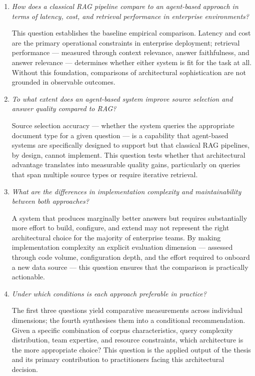 \begin{enumerate}

  \item \textit{How does a classical RAG pipeline compare to an agent-based approach in terms of latency, cost, and retrieval performance in enterprise environments?}

  This question establishes the baseline empirical comparison. Latency and cost are the primary operational constraints in enterprise deployment; retrieval performance — measured through context relevance, answer faithfulness, and answer relevance — determines whether either system is fit for the task at all. Without this foundation, comparisons of architectural sophistication are not grounded in observable outcomes.

  \item \textit{To what extent does an agent-based system improve source selection and answer quality compared to RAG?}

  Source selection accuracy — whether the system queries the appropriate document type for a given question — is a capability that agent-based systems are specifically designed to support but that classical RAG pipelines, by design, cannot implement. This question tests whether that architectural advantage translates into measurable quality gains, particularly on queries that span multiple source types or require iterative retrieval.

  \item \textit{What are the differences in implementation complexity and maintainability between both approaches?}

  A system that produces marginally better answers but requires substantially more effort to build, configure, and extend may not represent the right architectural choice for the majority of enterprise teams. By making implementation complexity an explicit evaluation dimension — assessed through code volume, configuration depth, and the effort required to onboard a new data source — this question ensures that the comparison is practically actionable.

  \item \textit{Under which conditions is each approach preferable in practice?}

  The first three questions yield comparative measurements across individual dimensions; the fourth synthesises them into a conditional recommendation. Given a specific combination of corpus characteristics, query complexity distribution, team expertise, and resource constraints, which architecture is the more appropriate choice? This question is the applied output of the thesis and its primary contribution to practitioners facing this architectural decision.

\end{enumerate}


